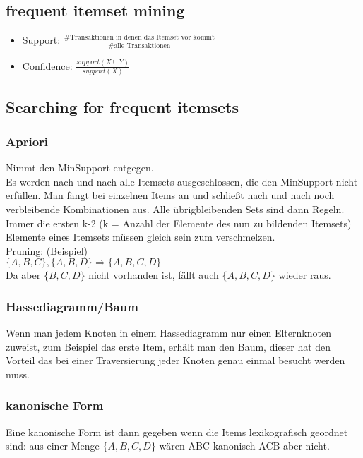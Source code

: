 \documentclass[a4paper]{scrartcl}
\begin{document}
\subsection{frequent itemset mining}
\begin{itemize}
\setlength{\parskip}{0pt}
\item Support: $\frac{\mbox{\#Transaktionen in denen das Itemset vor kommt}}{\mbox{\#alle Transaktionen}}$
\item Confidence: $\frac{support(X \cup Y)}{support(X)}$
\end{itemize}

\subsection{Searching for frequent itemsets}
\subsubsection{Apriori}
Nimmt den MinSupport entgegen.\\
Es werden nach und nach alle Itemsets ausgeschlossen, die den MinSupport nicht erfüllen. Man fängt bei einzelnen Items an und schließt nach und nach noch verbleibende Kombinationen aus. Alle übrigbleibenden Sets sind dann Regeln.\\
Immer die ersten k-2 (k = Anzahl der Elemente des nun zu bildenden Itemsets) Elemente eines Itemsets müssen gleich sein zum verschmelzen.\\
Pruning: (Beispiel)\\
$\{A,B,C\},\{A,B,D\} \Rightarrow \{A,B,C,D\}$\\
Da aber $\{B,C,D\}$ nicht vorhanden ist, fällt auch $\{A,B,C,D\}$ wieder raus.

\subsubsection{Hassediagramm/Baum}
Wenn man jedem Knoten in einem Hassediagramm nur einen Elternknoten zuweist, zum Beispiel das erste Item, erhält man den Baum, dieser hat den Vorteil das bei einer Traversierung jeder Knoten genau einmal besucht werden muss.
\subsubsection{kanonische Form}
Eine kanonische Form ist dann gegeben wenn die Items lexikografisch geordnet sind: aus einer Menge $\{A,B,C,D\}$ wären ABC kanonisch ACB aber nicht.
\end{document}
